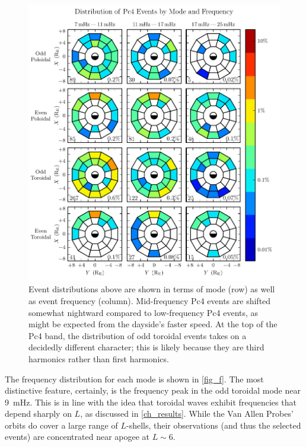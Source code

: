 \begin{figure}[!htb]
    \centering
    \includegraphics[width=\textwidth]{figures/mode_f.pdf}
    \caption[Rate of Pc4 Events by Mode and Frequency]{
      Event distributions above are shown in terms of mode (row) as well as event frequency (column). Mid-frequency Pc4 events are shifted somewhat nightward compared to low-frequency Pc4 events, as might be expected from the dayside's faster \Alfven speed. At the top of the Pc4 band, the distribution of odd toroidal events takes on a decidedly different character; this is likely because they are third harmonics rather than first harmonics. 
    }
    \label{fig_mode_f}
\end{figure}

The frequency distribution for each mode is shown in \cref{fig_f}. The most distinctive feature, certainly, is the frequency peak in the odd toroidal mode near \SI{9}{\mHz}. This is in line with the idea that toroidal waves exhibit frequencies that depend sharply on $L$, as discussed in \cref{ch_results}. While the Van Allen Probes' orbits do cover a large range of $L$-shells, their observations (and thus the selected events) are concentrated near apogee at $L \sim 6$. 

